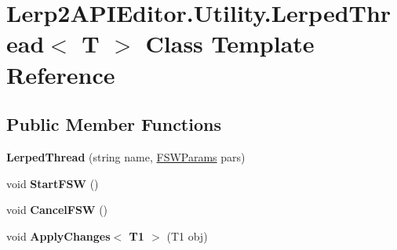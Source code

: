 \hypertarget{class_lerp2_a_p_i_editor_1_1_utility_1_1_lerped_thread}{}\section{Lerp2\+A\+P\+I\+Editor.\+Utility.\+Lerped\+Thread$<$ T $>$ Class Template Reference}
\label{class_lerp2_a_p_i_editor_1_1_utility_1_1_lerped_thread}
\subsection*{Public Member Functions}
\begin{DoxyCompactItemize}
\item 
\mbox{\label{class_lerp2_a_p_i_editor_1_1_utility_1_1_lerped_thread_aacf5f152ac26f2d26e36f4473e7cda98}} 
{\bfseries Lerped\+Thread} (string name, \hyperlink{class_lerp2_a_p_i_editor_1_1_utility_1_1_f_s_w_params}{F\+S\+W\+Params} pars)
\item 
\mbox{\label{class_lerp2_a_p_i_editor_1_1_utility_1_1_lerped_thread_a97f557394f9bfe74fc1be4d937ed7a71}} 
void {\bfseries Start\+F\+SW} ()
\item 
\mbox{\label{class_lerp2_a_p_i_editor_1_1_utility_1_1_lerped_thread_aabbc33217652af1e85bdfd31a47fb0b7}} 
void {\bfseries Cancel\+F\+SW} ()
\item 
\mbox{\label{class_lerp2_a_p_i_editor_1_1_utility_1_1_lerped_thread_a629e3792903979b729ea20c55a2fbae1}} 
void {\bfseries Apply\+Changes$<$ T1 $>$} (T1 obj)
\end{DoxyCompactItemize}

